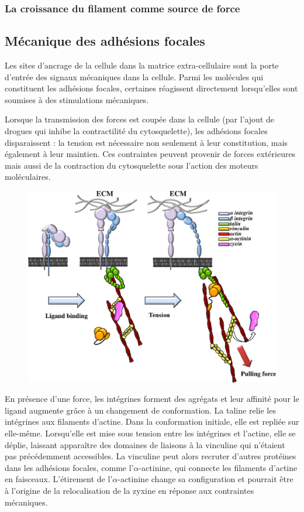 \subsubsection{La croissance du filament comme source de force}


\subsection{Mécanique des adhésions focales}

Les sites d'ancrage de la cellule dans la matrice extra-cellulaire sont la porte d'entrée des signaux mécaniques dans la cellule. Parmi les molécules qui constituent les adhésions focales, certaines réagissent directement lorsqu'elles sont soumises à des stimulations mécaniques. 

Lorsque la transmission des forces est coupée dans la cellule (par l'ajout de drogues qui inhibe la contractilité du cytosquelette), les adhésions focales disparaissent : la tension est nécessaire non seulement à leur constitution, mais également à leur maintien. Ces contraintes peuvent provenir de forces extérieures mais aussi de la contraction du cytosquelette sous l'action des moteurs moléculaires. 

\begin{figure}
\includegraphics[scale=0.2]{Focal_adhesions_taline.png}
\end{figure}

En présence d'une force, les intégrines forment des agrégats et leur affinité pour le ligand augmente grâce à un changement de conformation. 
La taline relie les intégrines aux filaments d'actine. Dans la conformation initiale, elle est repliée sur elle-même. Lorsqu'elle est mise sous tension entre les intégrines et l'actine, elle se déplie, laissant apparaître des domaines de liaisons à la vinculine qui n'étaient pas précédemment accessibles. 
La vinculine peut alors recruter d'autres protéines dans les adhésions focales, comme l'$\alpha$-actinine, qui connecte les filaments d'actine en faisceaux. L'étirement de l'$\alpha$-actinine change sa configuration et pourrait être à l'origine de la relocalisation de la zyxine en réponse aux contraintes mécaniques. 

